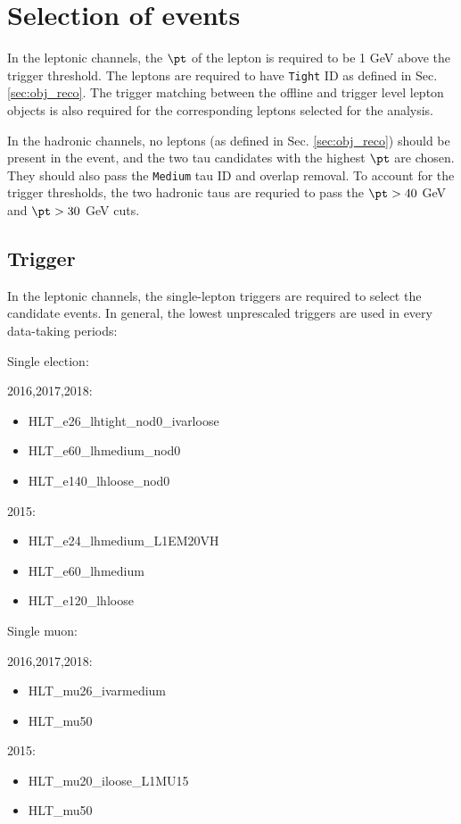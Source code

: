 \section{Selection of events}
\label{sec:selection}

In the leptonic channels, the $\pt$ of the lepton is required to be 1 GeV above the trigger threshold. The leptons are required to have \texttt{Tight} ID as defined in Sec. \ref{sec:obj_reco}. The trigger matching between the offline and trigger level lepton objects is also required for the corresponding leptons selected for the analysis.

In the hadronic channels, no leptons (as defined in Sec. \ref{sec:obj_reco}) should be present in the event, and the two tau candidates with the highest $\pt$ are chosen. They should also pass the \texttt{Medium} tau ID and overlap removal. To account for the trigger thresholds, the two hadronic taus are requried to pass the $\pt>40$ GeV and $\pt>30$ GeV cuts.

\subsection{Trigger}
\label{sec:trigger}

In the leptonic channels, the single-lepton triggers are required to select the candidate events. In general, the lowest unprescaled triggers are used in every data-taking periods:

Single election:

2016,2017,2018:
\begin{itemize}
	\item HLT\_e26\_lhtight\_nod0\_ivarloose
	\item HLT\_e60\_lhmedium\_nod0
	\item HLT\_e140\_lhloose\_nod0
\end{itemize}
2015:
\begin{itemize}
	\item HLT\_e24\_lhmedium\_L1EM20VH
	\item HLT\_e60\_lhmedium
	\item HLT\_e120\_lhloose
\end{itemize}

Single muon:

2016,2017,2018:
\begin{itemize}
	\item HLT\_mu26\_ivarmedium
	\item HLT\_mu50
\end{itemize}
2015:
\begin{itemize}
	\item HLT\_mu20\_iloose\_L1MU15
	\item HLT\_mu50
\end{itemize}

